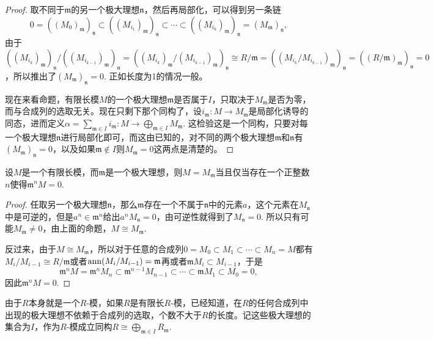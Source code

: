 \begin{proof}
	取不同于$\mathfrak{m}$的另一个极大理想$\mathfrak{n}$，然后再局部化，可以得到另一条链
	\[
	0=((M_0)_\mathfrak{m})_\mathfrak{n}\subset ((M_{i_1})_\mathfrak{m})_\mathfrak{n}\subset \cdots\subset ((M_{i_k})_\mathfrak{m})_\mathfrak{n}=(M_\mathfrak{m})_\mathfrak{n},
	\]
	由于$((M_{i_k})_\mathfrak{m})_\mathfrak{n}/((M_{i_{k-1}})_\mathfrak{m})_\mathfrak{n}=((M_{i_k})_\mathfrak{m}/(M_{i_{k-1}})_\mathfrak{m})_{\mathfrak{n}}\cong R/\mathfrak{m}=((M_{i_k}/M_{i_{k-1}})_\mathfrak{m})_\mathfrak{n}=((R/\mathfrak{m})_{\mathfrak{m}})_\mathfrak{n}=0$，所以推出了$(M_\mathfrak{m})_\mathfrak{n}=0$. 正如长度为1的情况一般。

	现在来看命题，有限长模$M$的一个极大理想$\mathfrak{m}$是否属于$I$，只取决于$M_\mathfrak{m}$是否为零，而与合成列的选取无关。现在只剩下那个同构了，设$i_\mathfrak{m}:M\to M_{\mathfrak{m}}$是局部化诱导的同态，进而定义$\alpha=\sum_{\mathfrak{m}\in I}i_{\mathfrak{m}}:M\to \bigoplus_{\mathfrak{m}\in I} M_{\mathfrak{m}}$. 这检验这是一个同构，只要对每一个极大理想$\mathfrak{n}$进行局部化即可，而这由已知的，对不同的两个极大理想$\mathfrak{m}$和$\mathfrak{n}$有$(M_\mathfrak{m})_\mathfrak{n}=0$，以及如果$\mathfrak{m}\not\in I$则$M_\mathfrak{m}=0$这两点是清楚的。
\end{proof}

\begin{pro}
设$M$是一个有限长模，而$\mathfrak{m}$是一个极大理想，则$M=M_{\mathfrak{m}}$当且仅当存在一个正整数$n$使得$\mathfrak{m}^nM=0$.
\end{pro}

\begin{proof}
	任取另一个极大理想$\mathfrak{n}$，那么$\mathfrak{m}$存在一个不属于$\mathfrak{n}$中的元素$a$，这个元素在$M_\mathfrak{n}$中是可逆的，但是$a^n\in \mathfrak{m}^n$给出$a^nM_\mathfrak{n}=0$，由可逆性就得到了$M_\mathfrak{n}=0$. 所以只有可能$M_\mathfrak{m}\neq 0$，由上面的命题，$M\cong M_\mathfrak{m}$.

	反过来，由于$M\cong M_\mathfrak{m}$，所以对于任意的合成列$0=M_0\subset M_1\subset \cdots\subset M_n=M$都有$M_i/M_{i-1}\cong R/\mathfrak{m}$或者$\operatorname{ann}(M_i/M_{i-1})=\mathfrak{m}$再或者$\mathfrak{m}M_{i}\subset M_{i-1}$，于是
	\[
	\mathfrak{m}^nM=\mathfrak{m}^nM_{n}\subset \mathfrak{m}^{n-1}M_{n-1}\subset \cdots \subset \mathfrak{m}M_1\subset M_0=0,
	\]
	因此$\mathfrak{m}^nM=0$.
\end{proof}

\para 由于$R$本身就是一个$R$-模，如果$R$是有限长$R$-模，已经知道，在$R$的任何合成列中出现的极大理想不依赖于合成列的选取，个数不大于$R$的长度。记这些极大理想的集合为$I$，作为$R$-模成立同构$R\cong\bigoplus_{\mathfrak{m}\in I}R_\mathfrak{m}$.

